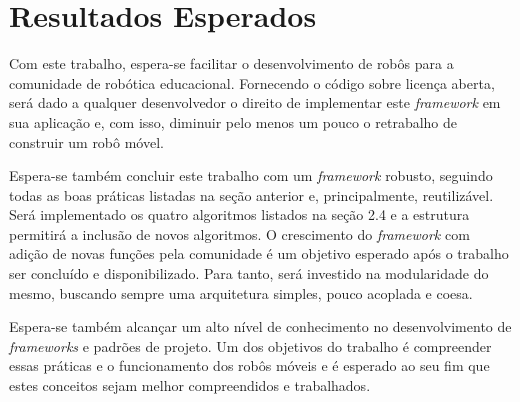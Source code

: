 \chapter[Resultados Esperados]{Resultados Esperados}

Com este trabalho, espera-se facilitar o desenvolvimento de robôs para a comunidade de robótica educacional. Fornecendo o código sobre licença aberta, será dado a qualquer desenvolvedor o direito de implementar este \textit{framework} em sua aplicação e, com isso, diminuir pelo menos um pouco o retrabalho de construir um robô móvel.

Espera-se também concluir este trabalho com um \textit{framework} robusto, seguindo todas as boas práticas listadas na seção anterior e, principalmente, reutilizável. Será implementado os quatro algoritmos listados na seção 2.4 e a estrutura permitirá a inclusão de novos algoritmos. O crescimento do \textit{framework} com adição de novas funções pela comunidade é um objetivo esperado após o trabalho ser concluído e disponibilizado. Para tanto, será investido na modularidade do mesmo, buscando sempre uma arquitetura simples, pouco acoplada e coesa.

Espera-se também alcançar um alto nível de conhecimento no desenvolvimento de \textit{frameworks} e padrões de projeto. Um dos objetivos do trabalho é compreender essas práticas e o funcionamento dos robôs móveis e é esperado ao seu fim que estes conceitos sejam melhor compreendidos e trabalhados.